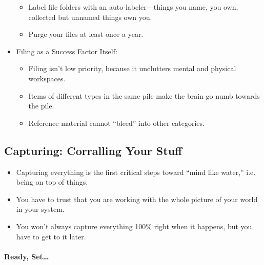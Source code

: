 \documentclass{article}
\begin{document}
\begin{itemize}
\begin{itemize}
    \item Label file folders with an auto-labeler---things you name, you own, collected but unnamed things own you.
    \item Purge your files at least once a year.
  \end{itemize}
  \item Filing as a Success Factor Itself:
  \begin{itemize}
    \item Filing isn't low priority, because it unclutters mental and physical workspaces.
    \item Items of different types in the same pile make the brain go numb towards the pile.
    \item Reference material cannot ``bleed'' into other categories.
  \end{itemize}
\end{itemize}

\subsection{Capturing: Corralling Your Stuff}

\begin{itemize}
  \item Capturing everything is the first critical steps toward ``mind like water,'' i.e. being on top of things.
  \item You have to trust that you are working with the whole picture of your world in your system.
  \item You won't always capture everything 100\% right when it happens, but you have to get to it later.
\end{itemize}

\paragraph{Ready, Set\ldots}
\end{document}
